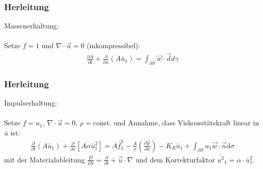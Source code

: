 \begin{frame}\frametitle{Herleitung}
Massenerhaltung:\\~\\
Setze $f=1$ und $\nabla \cdot \vec u = 0$ (inkompressibel):
\begin{align}
  \frac{\partial A}{\partial t} + \frac{\partial}{\partial x} (A \bar u_1) = \int_{\partial S} \vec w \cdot \vec d d\gamma %
\end{align}
\end{frame}

\begin{frame}\frametitle{Herleitung}
  Impulserhaltung:\\~\\
  Setze $f=u_1$, $\nabla \cdot \vec u = 0$, $\rho=$const. und Annahme, dass Viskousitätskraft linear in $\bar{u}$ ist:
\begin{align}
\boxed{
\frac{\partial}{\partial t} (A \bar u_1) + \frac{\partial}{\partial x} \left[ A \alpha \bar{u}_1^2 \right] = A \bar{f}^b_1 - \frac{A}{\rho}\left(\frac{\partial \vec{p}}{\partial x}\right)- K_R \bar{u}_1 + \int_{\partial S}u_1 \vec{w}\cdot \vec{n}\text{d}\sigma}
\end{align}
  mit der Materialableitung $\frac{D}{Dt}=\frac{\partial}{\partial t}+\vec{u}\cdot \nabla$ und dem Korrekturfaktor $\bar{u^2}_1=\alpha \cdot \bar{u}_1^2$. %
  \end{frame}
